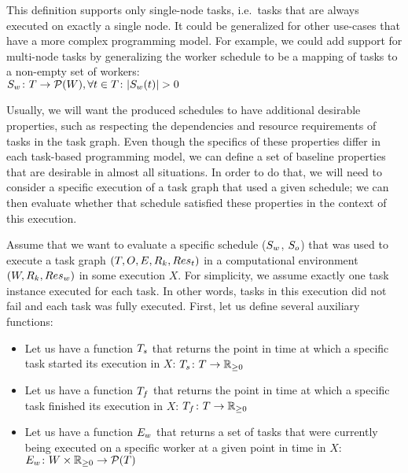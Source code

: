 This definition supports only single-node tasks, i.e.\ tasks that are always executed on exactly
a single node. It could be generalized for other use-cases that have a more complex programming
model. For example, we could add support for multi-node tasks by generalizing the worker schedule
to be a mapping of tasks to a non-empty set of workers: \\
$S_w\colon T \rightarrow \mathcal{P}(W), \forall t\in{}T\colon |S_w(t)| > 0$

Usually, we will want the produced schedules to have additional desirable properties, such as
respecting the dependencies and resource requirements of tasks in the task graph. Even though the
specifics of these properties differ in each task-based programming model, we can define a set of
baseline properties that are desirable in almost all situations. In order to do that, we will need
to consider a specific execution of a task graph that used a given schedule; we can then evaluate
whether that schedule satisfied these properties in the context of this execution.

Assume that we want to evaluate a specific schedule ($S_w$, $S_o$) that was used to execute a
task graph $(T, O, E, R_k, Res_t)$ in a computational environment
$(W, R_k, Res_w)$ in some
execution $X$. For simplicity, we assume exactly one task instance executed for each task. In other words,
tasks in this execution did not fail and each task was fully executed.
First, let us define several auxiliary functions:

\newcommand{\timedomain}{\mathbb{R}_{\geq{}0}}

\begin{itemize}
	\item Let us have a function $T_s$ that returns the point in time at which a specific
	      task started its execution in $X$: $\fntaskstart\colon T \rightarrow \timedomain$
	\item Let us have a function $T_f$ that returns the point in time at which a specific
	      task finished its execution in $X$: $\fntaskfinish\colon T \rightarrow \timedomain$
	\item Let us have a function $E_w$ that returns a set of tasks that were currently being
	      executed on a specific worker at a given point in time in $X$:
	      $\fnworkertaskassigned\colon W \times \timedomain \rightarrow \powerset{T}$
\end{itemize}

